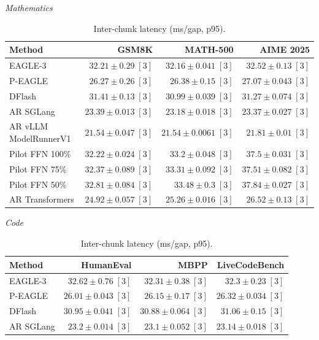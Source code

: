\begin{table}[!htp]
\centering\small
\setlength{\tabcolsep}{3pt}
\caption{Inter-chunk latency (ms/gap, p95).}
\label{tab:appendix-metric-pooled-gap-none}
\textit{Mathematics}\par\smallskip
\begin{tabular}{@{}>{\raggedright\arraybackslash}p{3.7cm}rrr@{}}
\toprule
Method & GSM8K & MATH-500 & AIME 2025 \\
\midrule
EAGLE-3 & \(32.21 \pm 0.29\;[3]\) & \(32.16 \pm 0.041\;[3]\) & \(32.52 \pm 0.13\;[3]\) \\
P-EAGLE & \(26.27 \pm 0.26\;[3]\) & \(26.38 \pm 0.15\;[3]\) & \(27.07 \pm 0.043\;[3]\) \\
DFlash & \(31.41 \pm 0.13\;[3]\) & \(30.99 \pm 0.039\;[3]\) & \(31.27 \pm 0.074\;[3]\) \\
AR \textperiodcentered{} SGLang & \(23.39 \pm 0.013\;[3]\) & \(23.18 \pm 0.018\;[3]\) & \(23.37 \pm 0.027\;[3]\) \\
AR \textperiodcentered{} vLLM ModelRunnerV1 & \(\mathbf{21.54} \pm 0.047\;[3]\) & \(\mathbf{21.54} \pm 0.0061\;[3]\) & \(\mathbf{21.81} \pm 0.01\;[3]\) \\
Pilot FFN 100\% & \(32.22 \pm 0.024\;[3]\) & \(33.2 \pm 0.048\;[3]\) & \(37.5 \pm 0.031\;[3]\) \\
Pilot FFN 75\% & \(32.37 \pm 0.089\;[3]\) & \(33.31 \pm 0.092\;[3]\) & \(37.51 \pm 0.082\;[3]\) \\
Pilot FFN 50\% & \(32.81 \pm 0.084\;[3]\) & \(33.48 \pm 0.3\;[3]\) & \(37.84 \pm 0.027\;[3]\) \\
AR \textperiodcentered{} Transformers & \(24.92 \pm 0.057\;[3]\) & \(25.26 \pm 0.016\;[3]\) & \(26.52 \pm 0.13\;[3]\) \\
\bottomrule
\end{tabular}\par\medskip
\textit{Code}\par\smallskip
\begin{tabular}{@{}>{\raggedright\arraybackslash}p{3.7cm}rrr@{}}
\toprule
Method & HumanEval & MBPP & LiveCodeBench \\
\midrule
EAGLE-3 & \(32.62 \pm 0.76\;[3]\) & \(32.31 \pm 0.38\;[3]\) & \(32.3 \pm 0.23\;[3]\) \\
P-EAGLE & \(26.01 \pm 0.043\;[3]\) & \(26.15 \pm 0.17\;[3]\) & \(26.32 \pm 0.034\;[3]\) \\
DFlash & \(30.95 \pm 0.041\;[3]\) & \(30.88 \pm 0.064\;[3]\) & \(31.06 \pm 0.15\;[3]\) \\
AR \textperiodcentered{} SGLang & \(23.2 \pm 0.014\;[3]\) & \(23.1 \pm 0.052\;[3]\) & \(23.14 \pm 0.018\;[3]\) \\

\end{tabular}
\end{table}

